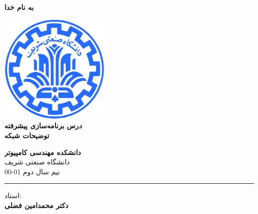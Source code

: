 \documentclass[]{article}
\begin{document}
\begin{titlepage}
\begin{center}


\textbf{ \Huge{به نام خدا} }
        
\vspace{0.2cm}

\includegraphics[width=0.4\textwidth]{sharif1.png}\\
\vspace{0.2cm}
\textbf{ \Huge{\emph درس برنامه‌سازی پیشرفته} }\\
\vspace{0.25cm}
\textbf{ \Large{ توضیحات شبکه} }
\vspace{0.2cm}
       
 
      \large \textbf{دانشکده مهندسی کامپیوتر}\\\vspace{0.1cm}
    \large   دانشگاه صنعتی شریف\\\vspace{0.2cm}
       \large   ﻧﯿﻢ سال دوم 01-00 \\\vspace{0.10cm}
      \noindent\rule[1ex]{\linewidth}{1pt}
استاد:\\
    \textbf{{دکتر محمدامین فضلی}}



    \vspace{0.20cm}


    

\end{center}
\end{titlepage}


\newpage
\pagestyle{fancy}
\fancyhf{}
\fancyfoot{}
\cfoot{\thepage}
\renewcommand{\headrulewidth}{2pt}
\end{document}
